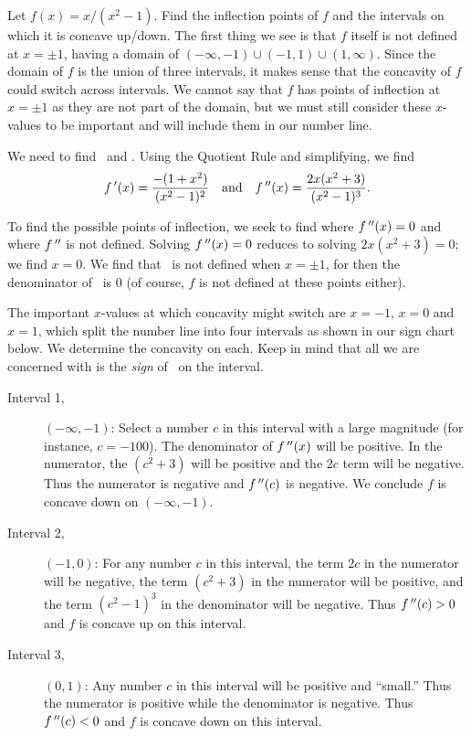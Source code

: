 \begin{example}\label{ex_conc2}%
Let $f(x)=x/(x^2-1)$. Find the inflection points of $f$ and the intervals on which it is concave up/down.
\solution
The first thing we see is that $f$ itself is not defined at $x=\pm1$, having a domain of $(-\infty,-1)\cup(-1,1)\cup(1,\infty)$. Since the domain of $f$ is the union of three intervals, it makes sense that the concavity of $f$ could switch across intervals. We cannot say that $f$ has points of inflection at $x=\pm1$ as they are not part of the domain, but we must still consider these $x$-values to be important and will include them in our number line.

We need to find \fp\ and \fpp. Using the Quotient Rule and simplifying, we find
\[
f\,'(x)=\frac{-(1+x^2)}{(x^2-1)^2}
\quad \text{and}\quad
f\,''(x) = \frac{2x(x^2+3)}{(x^2-1)^3}.
\]

To find the possible points of inflection, we seek to find where $f\,''(x)=0$ and where $f\,''$ is not defined. Solving $f\,''(x)=0$ reduces to solving $2x(x^2+3)=0$; we find $x=0$.  We find that \fpp\ is not defined when $x=\pm 1$, for then the denominator of \fpp\ is 0 (of course, $f$ is not defined at these points either).

The important $x$-values at which concavity might switch are $x=-1$, $x=0$ and $x=1$, which  split the number line into four intervals as shown in our sign chart below. We determine the concavity on each. Keep in mind that all we are concerned with is the \emph{sign} of \fpp\ on the interval.\bigskip

\begin{description}%
\item[Interval 1,] $(-\infty,-1)$: Select a number $c$ in this interval with a large magnitude (for instance, $c=-100$). The denominator of $f\,''(x)$ will be positive. In the numerator, the $(c^2+3)$ will be positive and the $2c$ term will be negative. Thus the numerator is negative and $f\,''(c)$ is negative. We conclude $f$ is concave down on $(-\infty,-1)$.

\item[Interval 2,] $(-1,0)$: For any number $c$ in this interval, the term $2c$ in the numerator will be negative, the term $(c^2+3)$ in the numerator will be positive, and the term $(c^2-1)^3$ in the denominator will be negative. Thus $f\,''(c)>0$ and $f$ is concave up on this interval.

\item[Interval 3,] $(0,1)$: Any number $c$ in this interval will be positive and ``small.'' Thus the numerator is positive while the denominator is negative. Thus $f\,''(c)<0$ and $f$ is concave down on this interval.


\end{description}
\end{example}
